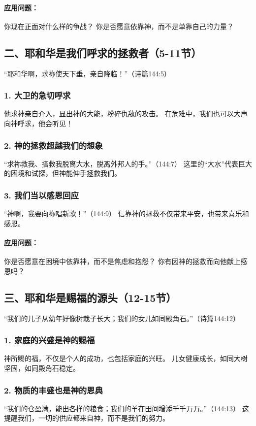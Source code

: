 \documentclass[a4paper, 12pt]{article}
\begin{document}
\paragraph*{应用问题：}
你现在正面对什么样的争战？
你是否愿意依靠神，而不是单靠自己的力量？
\subsection*{二、耶和华是我们呼求的拯救者（5-11节）}
“耶和华啊，求祢使天下垂，亲自降临！”（诗篇144:5）

\subsubsection*{1. 大卫的急切呼求}
他求神亲自介入，显出神的大能，粉碎仇敌的攻击。
在危难中，我们也可以大声向神呼求，他会听见！
\subsubsection*{2. 神的拯救超越我们的想象}
“求祢救我、搭救我脱离大水，脱离外邦人的手。”（144:7）
这里的“大水”代表巨大的困境和试探，但神能伸手拯救我们。
\subsubsection*{3. 我们当以感恩回应}
“神啊，我要向祢唱新歌！”（144:9）
信靠神的拯救不仅带来平安，也带来喜乐和感恩。
\paragraph*{应用问题：}
你是否愿意在困境中依靠神，而不是焦虑和抱怨？
你有因神的拯救而向他献上感恩吗？
\subsection*{三、耶和华是赐福的源头（12-15节）}
“我们的儿子从幼年好像树栽子长大；我们的女儿如同殿角石。”（诗篇144:12）

\subsubsection*{1. 家庭的兴盛是神的赐福}
神所赐的福，不仅是个人的成功，也包括家庭的兴旺。
儿女健康成长，如同大树坚固，如同殿角石稳定。
\subsubsection*{2. 物质的丰盛也是神的恩典}
“我们的仓盈满，能出各样的粮食；我们的羊在田间增添千千万万。”（144:13）
这提醒我们，一切的供应都来自神，而不是我们的努力。
\end{document}
